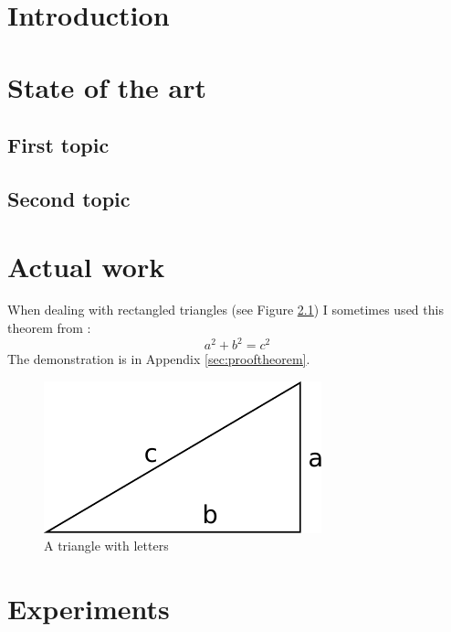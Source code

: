 \documentclass{thesisreport}
\begin{document}
 \listoffigures
 
\listoftables
 
 \tableofcontents
 
 
 \chapter*{Introduction}
 
 
 \chapter{State of the art}
 
 \section{First topic}
 
 \section{Second topic}
 
 \chapter{Actual work}
  
 
 When dealing with rectangled triangles (see Figure \ref{triangle}) I sometimes used this theorem from \cite{pythm001}:
 \begin{equation}\label{theo}
  a^2 + b^2 = c^2
 \end{equation}The demonstration is in Appendix \ref{sec:prooftheorem}.
 
 \begin{figure}[h]\centering
  \includegraphics[width=.5\linewidth]{triangle1}
  \caption{A triangle with letters} \label{triangle}
 \end{figure}
 
 


 
 
 \chapter{Experiments}
 
\end{document}
